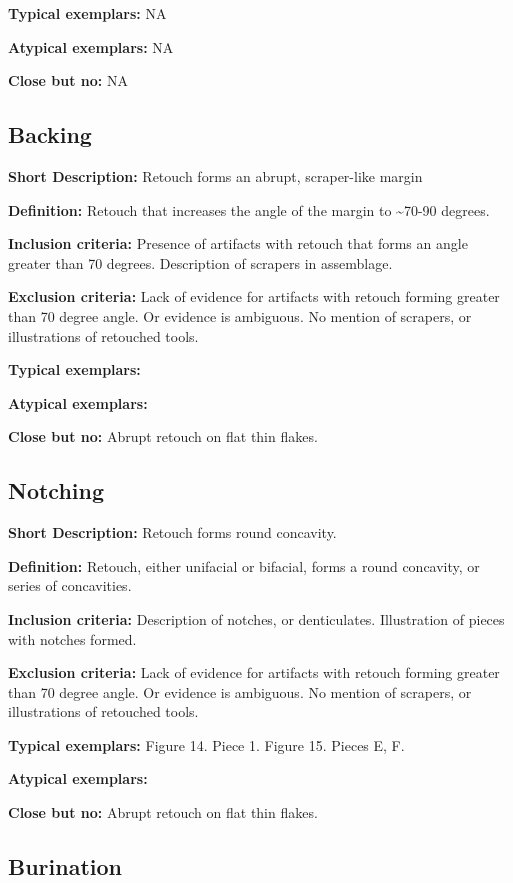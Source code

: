 \documentclass[
]{article}
\begin{document}
\textbf{Typical exemplars:} NA

\textbf{Atypical exemplars:} NA

\textbf{Close but no:} NA

\hypertarget{backing}{%
\subsection{Backing}\label{backing}}

\textbf{Short Description:} Retouch forms an abrupt, scraper-like margin

\textbf{Definition:} Retouch that increases the angle of the margin to
\textasciitilde70-90 degrees.

\textbf{Inclusion criteria:} Presence of artifacts with retouch that
forms an angle greater than 70 degrees. Description of scrapers in
assemblage.

\textbf{Exclusion criteria:} Lack of evidence for artifacts with retouch
forming greater than 70 degree angle. Or evidence is ambiguous. No
mention of scrapers, or illustrations of retouched tools.

\textbf{Typical exemplars:}

\textbf{Atypical exemplars:}

\textbf{Close but no:} Abrupt retouch on flat thin flakes.

\hypertarget{notching}{%
\subsection{Notching}\label{notching}}

\textbf{Short Description:} Retouch forms round concavity.

\textbf{Definition:} Retouch, either unifacial or bifacial, forms a
round concavity, or series of concavities.

\textbf{Inclusion criteria:} Description of notches, or denticulates.
Illustration of pieces with notches formed.

\textbf{Exclusion criteria:} Lack of evidence for artifacts with retouch
forming greater than 70 degree angle. Or evidence is ambiguous. No
mention of scrapers, or illustrations of retouched tools.

\textbf{Typical exemplars:} Figure 14. Piece 1. Figure 15. Pieces E, F.

\textbf{Atypical exemplars:}

\textbf{Close but no:} Abrupt retouch on flat thin flakes.

\hypertarget{burination}{%
\subsection{Burination}\label{burination}}
\end{document}
